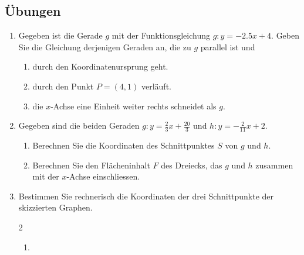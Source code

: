\subsection{Übungen}
\begin{enumerate}
    \item Gegeben ist die Gerade $g$ mit der Funktionsgleichung $g: y = -2.5x + 4$. Geben Sie die Gleichung derjenigen Geraden an, die zu $g$ parallel ist und
          \begin{enumerate}
              \item durch den Koordinatenursprung geht.
              \item durch den Punkt $P = (4,1)$ verläuft.
              \item die $x$-Achse eine Einheit weiter rechts schneidet als $g$.
          \end{enumerate}
    \item Gegeben sind die beiden Geraden $g: y = \frac{2}{3}x + \frac{20}{3}$ und $h: y = -\frac{2}{11}x + 2$.
          \begin{enumerate}
              \item Berechnen Sie die Koordinaten des Schnittpunktes $S$ von $g$ und $h$.
              \item Berechnen Sie den Flächeninhalt $F$ des Dreiecks, das $g$ und $h$ zusammen mit der $x$-Achse einschliessen.
          \end{enumerate}
    \item Bestimmen Sie rechnerisch die Koordinaten der drei Schnittpunkte der skizzierten Graphen.
          \begin{multicols}{2}
              \begin{enumerate}
                  \item {}
\end{enumerate}
\end{multicols}
\end{enumerate}
